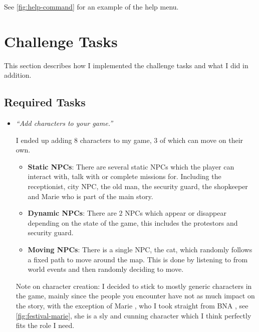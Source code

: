 \documentclass{article}
\begin{document}
\begin{multicols}{2}
\begin{itemize}[leftmargin=*]
                    See \autoref{fig:help-command} for an example of the help menu.
            \end{itemize}

        \setlength{\parskip}{0.1cm plus4mm minus3mm}
        \section{Challenge Tasks}

            This section describes how I implemented the challenge tasks and what I did in addition.

            \subsection{Required Tasks}
            \begin{itemize}[leftmargin=*]
                \item \textit{``Add characters to your game.''}
                
                    I ended up adding $8$ characters to my game, $3$ of which can move on their own.

                    \begin{itemize}[leftmargin=*]
                        \item \textbf{Static NPCs}: There are several static NPCs which the player can interact with, talk with or complete missions for.
                        Including the receptionist, city NPC, the old man, the security guard, the shopkeeper and Marie who is part of the main story.
                        \item \textbf{Dynamic NPCs}: There are $2$ NPCs which appear or disappear depending on the state of the game, this includes the protestors and security guard.
                        \item \textbf{Moving NPCs}: There is a single NPC, the cat, which randomly follows a fixed path to move around the map. This is done by listening to  from world events and then randomly deciding to move.
                    \end{itemize}

                    Note on character creation: I decided to stick to mostly generic characters in the game, mainly since the people you encounter have not as much impact on the story, with the exception of Marie \cite{marie}, who I took straight from BNA \cite{bna}, see \autoref{fig:festival-marie}, she is a sly and cunning character which I think perfectly fits the role I need.


\end{itemize}
\end{multicols}
\end{document}
